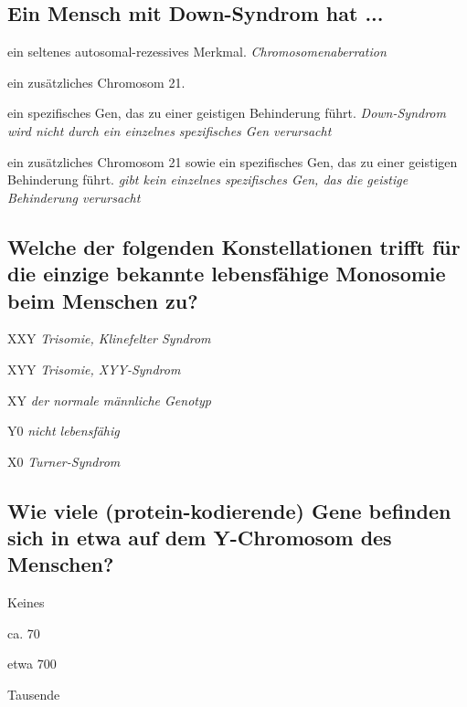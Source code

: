 \documentclass{article}
\newcommand{\cmark}{\ding{51}}%
\newcommand{\done}{\rlap{$\square$}{\raisebox{2pt}{\large\hspace{1pt}\cmark}}%
\hspace{-2.5pt}}
\begin{document}
\subsection*{Ein Mensch mit Down-Syndrom hat ...}
\begin{todolist}%
\item ein seltenes autosomal-rezessives Merkmal. \textit{\scriptsize Chromosomenaberration}
\item[\done] ein zusätzliches Chromosom 21.
\item ein spezifisches Gen, das zu einer geistigen Behinderung führt. \textit{\scriptsize Down-Syndrom wird nicht durch ein einzelnes spezifisches Gen verursacht}
\item ein zusätzliches Chromosom 21 sowie ein spezifisches Gen,
das zu einer geistigen Behinderung führt. \textit{\scriptsize gibt kein einzelnes spezifisches Gen, das die geistige Behinderung verursacht}
\end{todolist}

\subsection*{Welche der folgenden Konstellationen trifft für die einzige bekannte lebensfähige Monosomie beim Menschen zu?}
\begin{todolist}%
\item XXY \textit{\scriptsize Trisomie, Klinefelter Syndrom}
\item XYY \textit{\scriptsize Trisomie, XYY-Syndrom}
\item XY \textit{\scriptsize der normale männliche Genotyp}
\item Y0 \textit{\scriptsize nicht lebensfähig}
\item[\done] X0    \textit{\scriptsize Turner-Syndrom}
\end{todolist}

\subsection*{Wie viele (protein-kodierende) Gene befinden sich in etwa auf dem Y-Chromosom des Menschen?}
\begin{todolist}%
\item Keines
\item[\done] ca. 70
\item etwa 700
\item Tausende
\end{todolist}
\end{document}
